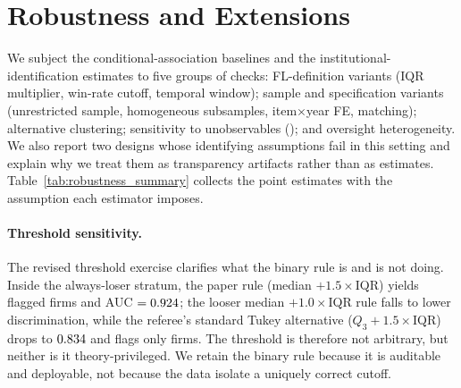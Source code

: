 \section{Robustness and Extensions}
\label{sec:robustness}

We subject the conditional-association baselines and the
institutional-identification estimates to five groups of checks:
FL-definition variants (IQR multiplier, win-rate cutoff, temporal
window); sample and specification variants (unrestricted sample,
homogeneous subsamples, item$\times$year FE, matching);
alternative clustering; sensitivity to unobservables
(\citealt{cinelli2020making, oster2019unobservable}); and
oversight heterogeneity. We also report two designs whose
identifying assumptions fail in this setting and explain why we
treat them as transparency artifacts rather than as estimates.
Table~\ref{tab:robustness_summary} collects the point
estimates with the assumption each estimator imposes.



\paragraph{Threshold sensitivity.}
The revised threshold exercise clarifies what the binary rule is
and is not doing. Inside the always-loser stratum, the paper
rule (median $+ 1.5\times$IQR) yields \valFL flagged firms and
AUC $=0.924$; the looser median $+ 1.0\times$IQR rule
falls to lower discrimination, while the referee's standard
Tukey alternative ($Q_3 + 1.5\times$IQR) drops to
$0.834$ and flags only \valFLQThreeIQR firms. The
threshold is therefore not arbitrary, but neither is it
theory-privileged. We retain the binary rule because it is
auditable and deployable, not because the data isolate a
uniquely correct cutoff.



